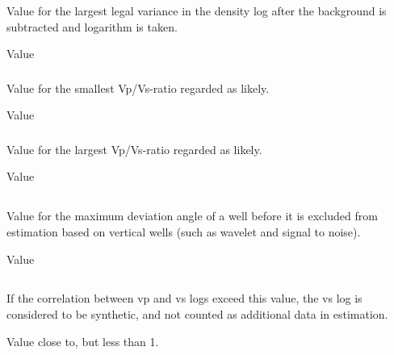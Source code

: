 \subsubsection{}
 \slist
   \item \Description Value for the largest legal variance in the density log after the background is subtracted and logarithm is taken.
   \item \Argument Value
   \item {}
 \elist

\subsubsection{}
 \slist
   \item \Description Value for the smallest Vp/Vs-ratio regarded as likely.
   \item \Argument Value
   \item {}
 \elist

\subsubsection{}
 \slist
   \item \Description Value for the largest Vp/Vs-ratio regarded as likely.
   \item \Argument Value
   \item {}
 \elist

\subsection{}
 \slist
   \item \Description Value for the maximum deviation angle of a well before it is excluded from estimation based on vertical wells (such as wavelet and signal to noise).
   \item \Argument Value
   \item {}
 \elist

\subsection{}
 \slist
   \item \Description If the correlation between vp and vs logs exceed this value, the vs log is considered to be synthetic, and not counted as additional data in estimation.
   \item \Argument Value close to, but less than 1.
   \item {}
 \elist

